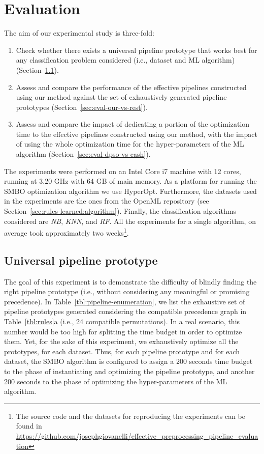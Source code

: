 \section{Evaluation}
\label{sec:evaluation}

The aim of our experimental study is three-fold:
\begin{enumerate}
    \item Check whether there exists a universal pipeline prototype that works best for any classification problem considered  (i.e., dataset and ML algorithm) (Section~\ref{sec:eval-universal-pipeline}).
    \item Assess and compare the performance of the effective pipelines constructed using our method against the set of exhaustively generated pipeline prototypes (Section~\ref{sec:eval-our-vs-rest}).
    \item Assess and compare the impact of dedicating a portion of the optimization time to the effective pipelines constructed using our method, with the impact of using the whole optimization time for the hyper-parameters of the ML algorithm (Section~\ref{sec:eval-dpso-vs-cash}).
\end{enumerate}

The experiments were performed on an Intel Core i7 machine with 12 cores, running at 3.20 GHz with 64 GB of main memory. As a platform for running the SMBO optimization algorithm we use HyperOpt. Furthermore, the datasets used in the experiments are the ones from the OpenML repository (see Section~\ref{sec:rules-learned:algorithm}). Finally, the classification algorithms considered are \textit{NB}, \textit{KNN}, and \textit{RF}. All the experiments for a single algorithm, on average took approximately two weeks\footnote{The source code and the datasets for reproducing the experiments can be found in 
\href{https://github.com/josephgiovanelli/effective\_preprocessing\_pipeline\_evaluation}{https://github.com/josephgiovanelli/effective\_preprocessing\_pipeline\_evaluation}}.

\subsection{Universal pipeline prototype}
\label{sec:eval-universal-pipeline}
The goal of this experiment is to demonstrate the difficulty of blindly finding the right pipeline prototype (i.e., without considering any meaningful or promising precedence).
In Table~\ref{tbl:pipeline-enumeration}, we list the exhaustive set of pipeline prototypes generated considering the compatible precedence graph in Table~\ref{tbl:rules}a (i.e., 24 compatible permutations). In a real scenario, this number would be too high for splitting the time budget in order to optimize them. 
Yet, for the sake of this experiment, we exhaustively optimize all the prototypes, for each dataset. Thus, for each pipeline prototype and for each dataset, the SMBO algorithm is configured to assign a 200 seconds time budget to the phase of instantiating and optimizing the pipeline prototype, and another 200 seconds to the phase of optimizing the hyper-parameters of the ML algorithm.

